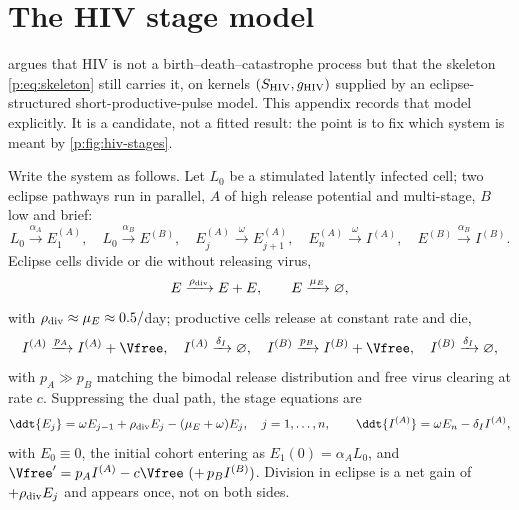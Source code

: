 
\section{The HIV stage model}
\label{p:app:hivstages}

 argues that HIV is not a birth--death--catastrophe process
but that the skeleton \cref{p:eq:skeleton} still carries it, on kernels
$(S_{\rm HIV},g_{\rm HIV})$ supplied by an eclipse-structured
short-productive-pulse model. This appendix records that model explicitly.
It is a candidate, not a fitted result: the point is to fix which system is
meant by \cref{p:fig:hiv-stages}.

Write the system as follows. Let
$L_0$ be a stimulated latently infected cell; two eclipse pathways run in
parallel, $A$ of high release potential and multi-stage, $B$ low and brief:
\begin{equation}
L_0\xrightarrow{\alpha_A}E_1^{(A)},
\quad
L_0\xrightarrow{\alpha_B}E^{(B)},
\quad
E_j^{(A)}\xrightarrow{\ \omega\ }E_{j+1}^{(A)},
\quad
E_n^{(A)}\xrightarrow{\ \omega\ }I^{(A)},
\quad
E^{(B)}\xrightarrow{\alpha_B}I^{(B)}.
\label{p:eq:hiv-paths}
\end{equation}
Eclipse cells divide or die without releasing virus,
\begin{equation}
E\xrightarrow{\rho_{\rm div}}E+E,
\qquad
E\xrightarrow{\mu_E}\varnothing,
\label{p:eq:hiv-eclipse-events}
\end{equation}
with $\rho_{\rm div}\approx\mu_E\approx0.5/$day; productive cells release at
constant rate and die,
\begin{equation}
I^{(A)}\xrightarrow{p_A}I^{(A)}+\Vfree,
\quad
I^{(A)}\xrightarrow{\delta_I}\varnothing,
\quad
I^{(B)}\xrightarrow{p_B}I^{(B)}+\Vfree,
\quad
I^{(B)}\xrightarrow{\delta_I}\varnothing,
\label{p:eq:hiv-prod-events}
\end{equation}
with $p_A\gg p_B$ matching the bimodal release distribution and free virus
clearing at rate $c$. Suppressing the dual path, the stage equations are
\begin{equation}
\ddt{E_j}=\omega E_{j-1}+\rho_{\rm div}E_j-(\mu_E+\omega)E_j,
\quad j=1,\dots,n,
\qquad
\ddt{I^{(A)}}=\omega E_n-\delta_I I^{(A)},
\label{p:eq:hiv-stage-odes}
\end{equation}
with $E_0\equiv0$, the initial cohort entering as $E_1(0)=\alpha_AL_0$, and
$\Vfree'=p_AI^{(A)}-c\Vfree\ (+\,p_BI^{(B)})$. Division in eclipse is a net
gain of $+\rho_{\rm div}E_j$ and appears once, not on both sides.


\FloatBarrier

